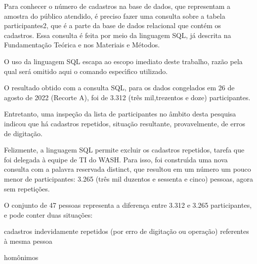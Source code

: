 \documentclass[
12pt,		%
openright,	%
twoside,  %
a4paper,			%
chapter=TITLE,		%
english,			%
french,				%
spanish,			%
brazil				%
]{USPSC-classe/USPSC}
\begin{document}
Para conhecer o n\'umero de cadastros na base de dados, que representam a amostra do p\'ublico atendido, \'e preciso fazer uma consulta sobre a tabela \textquotedbl participantes2\textquotedbl , que \'e a parte da base de dados relacional que cont\'em os cadastros. Essa consulta \'e feita por meio da linguagem SQL, j\'a descrita na Fundamenta\c{c}\~ao Te\'orica e nos Materiais e M\'etodos.








O uso da linguagem SQL escapa ao escopo imediato deste trabalho, raz\~ao pela qual ser\'a omitido aqui o comando espec\'{\i}fico utilizado.








O resultado obtido com a consulta SQL, para os dados congelados em 26 de agosto de 2022 (Recorte A), foi de 3.312 (tr\^es mil,trezentos e doze) participantes.








Entretanto, uma inspe\c{c}\~ao da lista de participantes no \^ambito desta pesquisa indicou que h\'a cadastros repetidos, situa\c{c}\~ao resultante, provavelmente, de erros de digita\c{c}\~ao.








Felizmente, a linguagem SQL permite excluir os cadastros repetidos, tarefa que foi delegada \`a equipe de TI do WASH. Para isso, foi constru\'{\i}da uma nova consulta com a palavra reservada \textquotedbl distinct\textquotedbl , que resultou em um n\'umero um pouco menor de participantes: 3.265 (tr\^es mil duzentos e sessenta e cinco) pessoas, agora sem repeti\c{c}\~oes.








O conjunto de 47 pessoas representa a diferen\c{c}a entre 3.312 e 3.265 participantes, e pode conter duas situa\c{c}\~oes:









\begin{alineas}
\item cadastros indevidamente repetidos (por erro de digita\c{c}\~ao ou opera\c{c}\~ao) referentes \`a mesma pessoa
\item hom\^onimos
\end{alineas}
\end{document}
